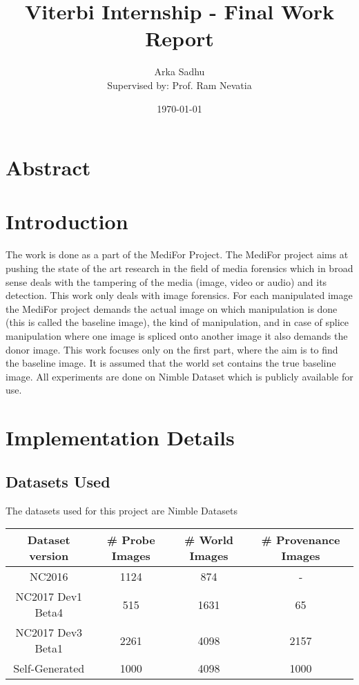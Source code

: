 \documentclass{article}
\title{Viterbi Internship - Final Work Report}
\author{Arka Sadhu\\{ Supervised by: Prof. Ram Nevatia}}
\date{\today}
\begin{document}
\maketitle

\tableofcontents
\newpage

\section{Abstract}

\section{Introduction}
The work is done as a part of the MediFor Project. The MediFor project aims at pushing the state of the art research in the field of media forensics which in broad sense deals with the tampering of the media (image, video or audio) and its detection. This work only deals with image forensics. For each manipulated image the MediFor project demands the actual image on which manipulation is done (this is called the baseline image), the kind of manipulation, and in case of splice manipulation where one image is spliced onto another image it also demands the donor image. This work focuses only on the first part, where the aim is to find the baseline image. It is assumed that the world set contains the true baseline image. All experiments are done on Nimble Dataset which is publicly available for use.
\section{Implementation Details}
\subsection{Datasets Used}
The datasets used for this project are Nimble Datasets
\begin{center}
  \begin{tabular}{| c | c | c | c |}
    \hline
    Dataset version & \# Probe Images & \# World Images & \# Provenance Images\\
    \hline
    NC2016 & 1124 & 874 & - \\
    \hline
    NC2017 Dev1 Beta4 & 515 & 1631 & 65 \\
    \hline
    NC2017 Dev3 Beta1 & 2261 & 4098 & 2157 \\
    \hline
    Self-Generated & 1000 & 4098 & 1000 \\
    \hline
  \end{tabular}
\end{center}
\end{document}
